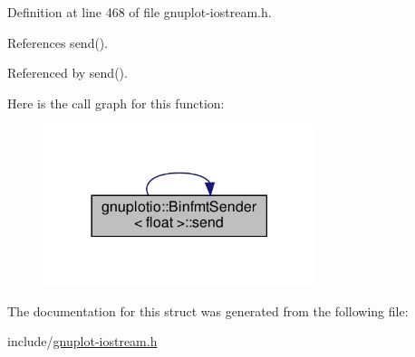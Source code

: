 Definition at line 468 of file gnuplot-\/iostream.\+h.



References send().



Referenced by send().

Here is the call graph for this function\+:\nopagebreak
\begin{figure}[H]
\begin{center}
\leavevmode
\includegraphics[width=225pt]{structgnuplotio_1_1_binfmt_sender_3_01float_01_4_ae9c6a1915ee24e54ea5ed1a22c54fee1_cgraph}
\end{center}
\end{figure}


The documentation for this struct was generated from the following file\+:\begin{DoxyCompactItemize}
\item 
include/\hyperlink{gnuplot-iostream_8h}{gnuplot-\/iostream.\+h}\end{DoxyCompactItemize}
